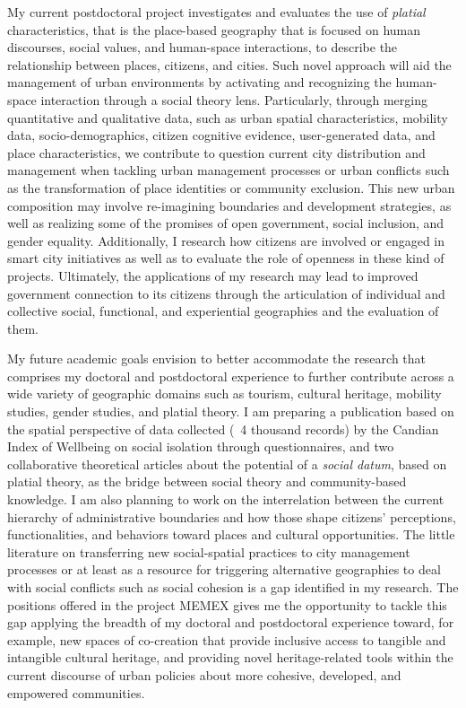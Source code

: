 
My current postdoctoral project investigates and evaluates the use of \emph{platial} characteristics, that is the place-based geography that is focused on human discourses, social values, and human-space interactions, to describe the relationship between places, citizens, and cities. Such novel approach will aid the management of urban environments by activating and recognizing the human-space interaction through a social theory lens. Particularly, through merging quantitative and qualitative data, such as urban spatial characteristics, mobility data, socio-demographics, citizen cognitive evidence, user-generated data, and place characteristics, we contribute to question current city distribution and management when tackling urban management processes or urban conflicts such as the transformation of place identities or community exclusion. This new urban composition may involve re-imagining boundaries and development strategies, as well as realizing some of the promises of open government, social inclusion, and gender equality. Additionally, I research how citizens are involved or engaged in smart city initiatives as well as to evaluate the role of openness in these kind of projects. Ultimately, the applications of my research may lead to improved government connection to its citizens through the articulation of individual and collective social, functional, and experiential geographies and the evaluation of them.\par



My future academic goals envision to better accommodate the research that comprises my doctoral and postdoctoral experience to further contribute across a wide variety of geographic domains such as tourism, cultural heritage, mobility studies, gender studies, and platial theory. I am preparing a publication based on the spatial perspective of data collected (~4 thousand records) by the Candian Index of Wellbeing on social isolation through questionnaires, and two collaborative theoretical articles about the potential of a \textit{social datum}, based on platial theory, as the bridge between social theory and community-based knowledge. I am also planning to work on the interrelation between the current hierarchy of administrative boundaries and how those shape citizens' perceptions, functionalities, and behaviors toward places and cultural opportunities. The little literature on transferring new social-spatial practices to city management processes or at least as a resource for triggering alternative geographies to deal with social conflicts such as social cohesion is a gap identified in my research. The positions offered in the project MEMEX gives me the opportunity to tackle this gap applying the breadth of my doctoral and postdoctoral experience toward, for example, new spaces of co-creation that provide inclusive access to tangible and intangible cultural heritage, and providing novel heritage-related tools within the current discourse of urban policies about more cohesive, developed, and empowered communities.\par

